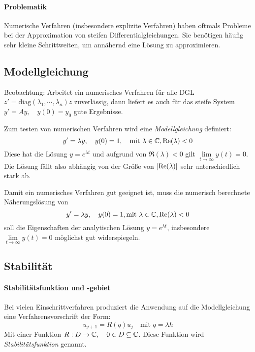 			\paragraph{Problematik}
				Numerische Verfahren (insbesondere explizite Verfahren) haben oftmals Probleme bei der Approximation von steifen Differentialgleichungen. Sie benötigen häufig sehr kleine Schrittweiten, um annähernd eine Lösung zu approximieren.

			\subsection{Modellgleichung}
				Beobachtung: Arbeitet ein numerisches Verfahren für alle DGL \( z' = \textrm{diag}(\lambda_1, \cdots, \lambda_n)z \) zuverlässig, dann liefert es auch für das steife System \( y' = Ay, \quad y(0) = y_0 \) gute Ergebnisse.

				Zum testen von numerischen Verfahren wird eine \textit{Modellgleichung} definiert:
				\begin{equation*}
					y' = \lambda y, \quad y(0) = 1, \quad \textrm{mit } \lambda \in \mathbb{C}, \Re(\lambda) < 0
				\end{equation*}
				Diese hat die Lösung \( y = e^{\lambda t} \) und aufgrund von \( \Re(\lambda) < 0 \) gilt \( \lim\limits_{t \rightarrow \infty} y(t) = 0 \). Die Lösung fällt also abhängig von der Größe von \(\abs{\Re(\lambda)}\) sehr unterschiedlich stark ab.

				Damit ein numerisches Verfahren gut geeignet ist, muss die numerisch berechnete Näherungslösung von
				\begin{equation*}
					y' = \lambda y, \quad y(0) = 1, \textrm{mit } \lambda \in \mathbb{C}, \Re(\lambda) < 0
				\end{equation*}
				soll die Eigenschaften der analytischen Lösung \( y = e^{\lambda t} \), insbesondere \( \lim\limits_{t \rightarrow \infty} y(t) = 0 \) möglichst gut widerspiegeln.

			\subsection{Stabilität}
				\paragraph{Stabilitätsfunktion und -gebiet}
					Bei vielen Einschrittverfahren produziert die Anwendung auf die Modellgleichung eine Verfahrensvorschrift der Form:
					\begin{equation*}
						u_{j+1} = R(q)u_j \quad \textrm{mit } q = \lambda h
					\end{equation*}
					Mit einer Funktion \( R : D \rightarrow \mathbb{C}, \quad 0 \in D \subseteq \mathbb{C} \). Diese Funktion wird \textit{Stabilitätsfunktion} genannt.

